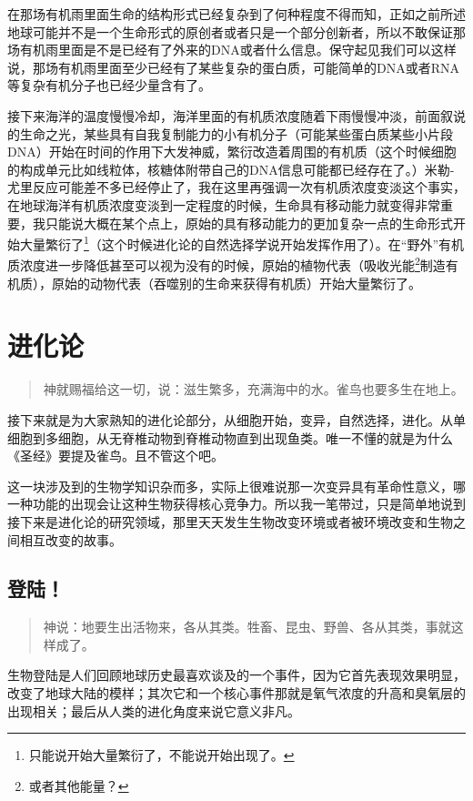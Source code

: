 \documentclass[11pt,oneside]{article}
\begin{document}
在那场有机雨里面生命的结构形式已经复杂到了何种程度不得而知，正如之前所述地球可能并不是一个生命形式的原创者或者只是一个部分创新者，所以不敢保证那场有机雨里面是不是已经有了外来的DNA或者什么信息。保守起见我们可以这样说，那场有机雨里面至少已经有了某些复杂的蛋白质，可能简单的DNA或者RNA等复杂有机分子也已经少量含有了。

接下来海洋的温度慢慢冷却，海洋里面的有机质浓度随着下雨慢慢冲淡，前面叙说的生命之光，某些具有自我复制能力的小有机分子（可能某些蛋白质某些小片段DNA）开始在时间的作用下大发神威，繁衍改造着周围的有机质（这个时候细胞的构成单元比如线粒体，核糖体附带自己的DNA信息可能都已经存在了。）米勒-尤里反应可能差不多已经停止了，我在这里再强调一次有机质浓度变淡这个事实，在地球海洋有机质浓度变淡到一定程度的时候，生命具有移动能力就变得非常重要，我只能说大概在某个点上，原始的具有移动能力的更加复杂一点的生命形式开始大量繁衍了\footnote{只能说开始大量繁衍了，不能说开始出现了。}（这个时候进化论的自然选择学说开始发挥作用了）。在“野外”有机质浓度进一步降低甚至可以视为没有的时候，原始的植物代表（吸收光能\footnote{或者其他能量？}制造有机质），原始的动物代表（吞噬别的生命来获得有机质）开始大量繁衍了。


\section{进化论}
\label{sec-6}
\begin{quote}
神就赐福给这一切，说：滋生繁多，充满海中的水。雀鸟也要多生在地上。 
\end{quote}


接下来就是为大家熟知的进化论部分，从细胞开始，变异，自然选择，进化。从单细胞到多细胞，从无脊椎动物到脊椎动物直到出现鱼类。唯一不懂的就是为什么《圣经》要提及雀鸟。且不管这个吧。

这一块涉及到的生物学知识杂而多，实际上很难说那一次变异具有革命性意义，哪一种功能的出现会让这种生物获得核心竞争力。所以我一笔带过，只是简单地说到接下来是进化论的研究领域，那里天天发生生物改变环境或者被环境改变和生物之间相互改变的故事。


\subsection{登陆！}
\label{sec-6-1}
\begin{quote}
神说：地要生出活物来，各从其类。牲畜、昆虫、野兽、各从其类，事就这样成了。 
\end{quote}


生物登陆是人们回顾地球历史最喜欢谈及的一个事件，因为它首先表现效果明显，改变了地球大陆的模样；其次它和一个核心事件那就是氧气浓度的升高和臭氧层的出现相关；最后从人类的进化角度来说它意义非凡。
\end{document}
